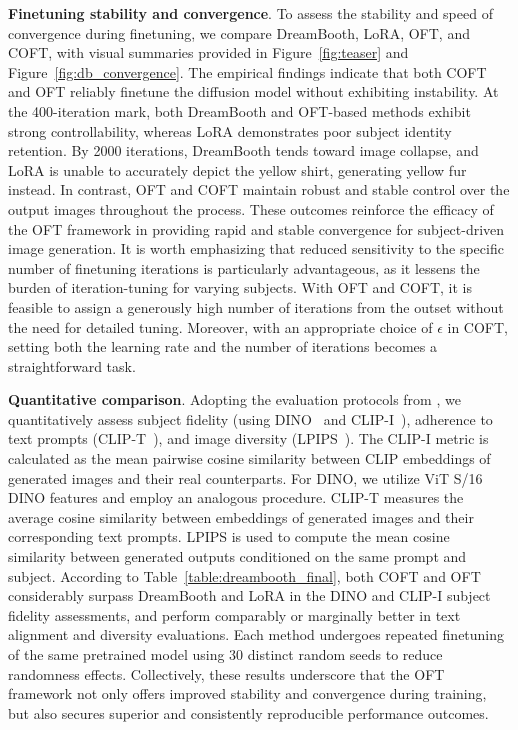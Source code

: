 \textbf{Finetuning stability and convergence}. To assess the stability and speed of convergence during finetuning, we compare DreamBooth, LoRA, OFT, and COFT, with visual summaries provided in Figure~\ref{fig:teaser} and Figure~\ref{fig:db_convergence}. The empirical findings indicate that both COFT and OFT reliably finetune the diffusion model without exhibiting instability. At the 400-iteration mark, both DreamBooth and OFT-based methods exhibit strong controllability, whereas LoRA demonstrates poor subject identity retention. By 2000 iterations, DreamBooth tends toward image collapse, and LoRA is unable to accurately depict the yellow shirt, generating yellow fur instead. In contrast, OFT and COFT maintain robust and stable control over the output images throughout the process. These outcomes reinforce the efficacy of the OFT framework in providing rapid and stable convergence for subject-driven image generation. It is worth emphasizing that reduced sensitivity to the specific number of finetuning iterations is particularly advantageous, as it lessens the burden of iteration-tuning for varying subjects. With OFT and COFT, it is feasible to assign a generously high number of iterations from the outset without the need for detailed tuning. Moreover, with an appropriate choice of $\epsilon$ in COFT, setting both the learning rate and the number of iterations becomes a straightforward task.

\textbf{Quantitative comparison}. Adopting the evaluation protocols from \cite{ruiz2023dreambooth}, we quantitatively assess subject fidelity (using DINO~\cite{caron2021emerging} and CLIP-I~\cite{radford2021learning}), adherence to text prompts (CLIP-T~\cite{radford2021learning}), and image diversity (LPIPS~\cite{zhang2018unreasonable}). The CLIP-I metric is calculated as the mean pairwise cosine similarity between CLIP embeddings of generated images and their real counterparts. For DINO, we utilize ViT S/16 DINO features and employ an analogous procedure. CLIP-T measures the average cosine similarity between embeddings of generated images and their corresponding text prompts. LPIPS is used to compute the mean cosine similarity between generated outputs conditioned on the same prompt and subject. According to Table~\ref{table:dreambooth_final}, both COFT and OFT considerably surpass DreamBooth and LoRA in the DINO and CLIP-I subject fidelity assessments, and perform comparably or marginally better in text alignment and diversity evaluations. Each method undergoes repeated finetuning of the same pretrained model using 30 distinct random seeds to reduce randomness effects. Collectively, these results underscore that the OFT framework not only offers improved stability and convergence during training, but also secures superior and consistently reproducible performance outcomes.


